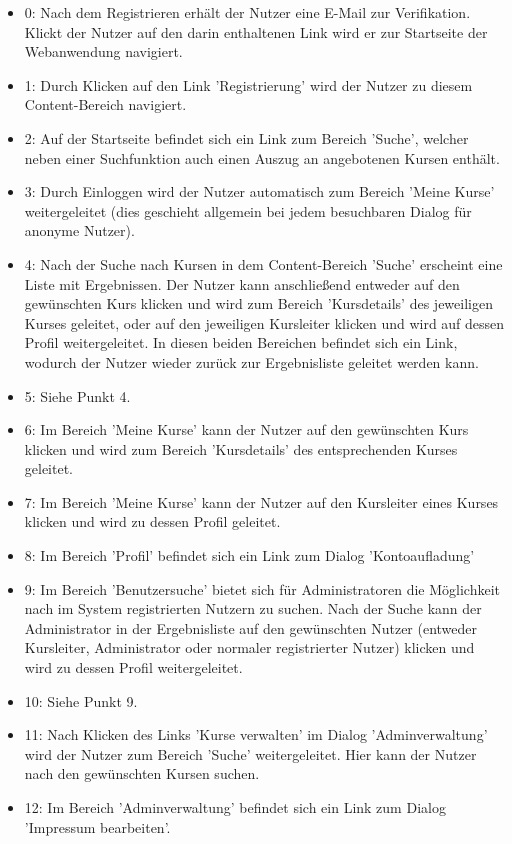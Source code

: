 \documentclass[a4paper]{scrreprt}
\begin{document}
\begin{itemize}
	    \begin{itemize}
	    \item 0: Nach dem Registrieren erhält der Nutzer eine E-Mail zur Verifikation. Klickt der Nutzer auf den darin enthaltenen Link wird er zur Startseite der Webanwendung navigiert.
	    \item 1: Durch Klicken auf den Link 'Registrierung' wird der Nutzer zu diesem Content-Bereich navigiert.
	    \item 2: Auf der Startseite befindet sich ein Link zum Bereich 'Suche', welcher neben einer Suchfunktion auch einen Auszug an angebotenen Kursen enthält.
	    \item 3: Durch Einloggen wird der Nutzer automatisch zum Bereich 'Meine Kurse' weitergeleitet (dies geschieht allgemein bei jedem besuchbaren Dialog für anonyme Nutzer).
	    \item 4: Nach der Suche nach Kursen in dem Content-Bereich 'Suche' erscheint eine Liste mit Ergebnissen. Der Nutzer kann anschließend entweder auf den gewünschten Kurs klicken und wird zum Bereich 'Kursdetails' des jeweiligen Kurses geleitet, oder auf den jeweiligen Kursleiter klicken und wird auf dessen Profil weitergeleitet. In diesen beiden Bereichen befindet sich ein Link, wodurch der Nutzer wieder zurück zur Ergebnisliste geleitet werden kann.
	    \item 5: Siehe Punkt 4.
	    \item 6: Im Bereich 'Meine Kurse' kann der Nutzer auf den gewünschten Kurs klicken und wird zum Bereich 'Kursdetails' des entsprechenden Kurses geleitet.
	    \item 7: Im Bereich 'Meine Kurse' kann der Nutzer auf den Kursleiter eines Kurses klicken und wird zu dessen Profil geleitet.
	    \item 8: Im Bereich 'Profil' befindet sich ein Link zum Dialog 'Kontoaufladung'
	    \item 9: Im Bereich 'Benutzersuche' bietet sich für Administratoren die Möglichkeit nach im System registrierten Nutzern zu suchen. Nach der Suche kann der Administrator in der Ergebnisliste auf den gewünschten Nutzer (entweder Kursleiter, Administrator oder normaler registrierter Nutzer) klicken und wird zu dessen Profil weitergeleitet.
	    \item 10: Siehe Punkt 9.
	    \item 11: Nach Klicken des Links 'Kurse verwalten' im Dialog 'Adminverwaltung' wird der Nutzer zum Bereich 'Suche' weitergeleitet. Hier kann der Nutzer nach den gewünschten Kursen suchen.
	    \item 12: Im Bereich 'Adminverwaltung' befindet sich ein Link zum Dialog 'Impressum bearbeiten'.

\end{itemize}
\end{itemize}
\end{document}
